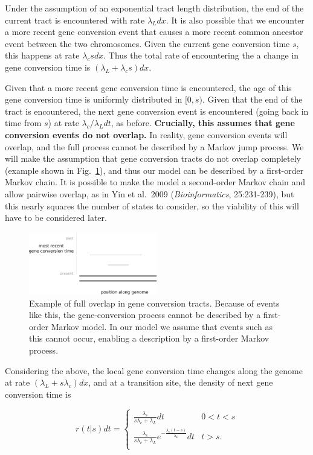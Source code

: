 \documentclass{article}
\begin{document}
Under the assumption of an exponential tract length distribution, the end of
the current tract is encountered with rate $\lambda_Ldx$. It is also possible
that we encounter a more recent gene conversion event that causes a more recent
common ancestor event between the two chromosomes. Given the current gene
conversion time $s$, this happens at rate $\lambda_c s dx$. Thus the total rate of
encountering the a change in gene conversion time is
$(\lambda_L+\lambda_cs)dx$.

Given that a more recent gene conversion time is encountered, the age of this
gene conversion time is uniformly distributed in $[0,s)$. Given that the end of
the tract is encountered, the next gene conversion event is encountered (going
back in time from $s$) at rate $\lambda_c/\lambda_L dt$, as before.
\textbf{Crucially, this assumes that gene conversion events do not overlap.} In
reality, gene conversion events will overlap, and the full process cannot be
described by a Markov jump process. We will make the assumption that gene
conversion tracts do not overlap completely (example shown in
Fig.~\ref{fig:overlap}), and thus our model can be described by a first-order
Markov chain. It is possible to make the model a second-order Markov chain and
allow pairwise overlap, as in Yin et al.\ 2009 (\textit{Bioinformatics},
25:231-239), but this nearly squares the number of states to consider, so the
viability of this will have to be considered later.

\begin{figure}
    \centering
    \includegraphics[width=0.5\textwidth]{figs/overlap.pdf}
    \caption{Example of full overlap in gene conversion tracts. Because of
    events like this, the gene-conversion process cannot be described by a
    first-order Markov model. In our model we assume that events such as this
    cannot occur, enabling a description by a first-order Markov process.}
    \label{fig:overlap}
\end{figure}

Considering the above, the local gene conversion time changes along the genome
at rate $(\lambda_L + s\lambda_c)dx$, and at a transition site, the density of
next gene conversion time is

\begin{equation}
    r(t|s)dt = 
    \begin{cases}
        \frac{\lambda_c}{s\lambda_c+\lambda_L}dt & 0<t<s\\
        \frac{\lambda_c}{s\lambda_c+\lambda_L}e^{-\frac{\lambda_c(t-s)}{\lambda_L}}dt &  t>s.\\
    \end{cases}
\end{equation}
\end{document}
